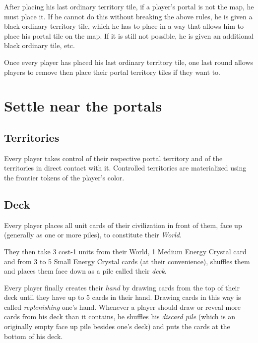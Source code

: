 \documentclass[a4paper]{article}
\begin{document}
        After placing his last ordinary territory tile,
        if a player's portal is not the map, he must place it.
        If he cannot do this without breaking the above rules,
        he is given a black ordinary territory tile,
        which he has to place in a way that allows him to place his portal tile on the map.
        If it is still not possible, he is given an additional black ordinary tile, etc.
        
        Once every player has placed his last ordinary territory tile,
        one last round allows players to remove then place their portal territory tiles
        if they want to.
    

\section{Settle near the portals}
    \subsection{Territories}
        Every player takes control of their respective portal territory
        and of the territories in direct contact with it.
        Controlled territories are materialized using the frontier tokens
        of the player's color.
        
    \subsection{Deck}
        Every player places all unit cards of their civilization in front of them,
        face up (generally as one or more piles), to constitute their \textit{World}.
        
        They then take 3 cost-1 units from their World,
        1 Medium Energy Crystal card and from 3 to 5 Small Energy Crystal cards
        (at their convenience),
        shuffles them and places them face down as a pile called their \textit{deck}.
        
        Every player finally creates their \textit{hand} by drawing cards from the top
        of their deck until they have up to 5 cards in their hand.
        Drawing cards in this way is called \textit{replenishing} one's hand.
        Whenever a player should draw or reveal more cards from his deck
        than it contains, he shuffles his \textit{discard pile}
        (which is an originally empty face up pile besides one's deck)
        and puts the cards at the bottom of his deck.
        
\end{document}

